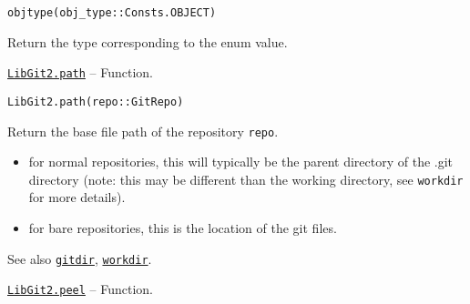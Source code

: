 \begin{adjustwidth}{2em}{0pt}


\begin{verbatim}
objtype(obj_type::Consts.OBJECT)
\end{verbatim}

Return the type corresponding to the enum value.



\end{adjustwidth}
\hypertarget{7655803558162329563}{}
\hyperlink{7655803558162329563}{\texttt{LibGit2.path}}  -- {Function.}

\begin{adjustwidth}{2em}{0pt}


\begin{verbatim}
LibGit2.path(repo::GitRepo)
\end{verbatim}

Return the base file path of the repository \texttt{repo}.

\begin{itemize}
\item for normal repositories, this will typically be the parent directory of the {\textquotedbl}.git{\textquotedbl} directory (note: this may be different than the working directory, see \texttt{workdir} for more details).


\item for bare repositories, this is the location of the {\textquotedbl}git{\textquotedbl} files.

\end{itemize}
See also \hyperlink{12125979754140967861}{\texttt{gitdir}}, \hyperlink{6689577338311178757}{\texttt{workdir}}.



\end{adjustwidth}
\hypertarget{16139465008527879046}{}
\hyperlink{16139465008527879046}{\texttt{LibGit2.peel}}  -- {Function.}


